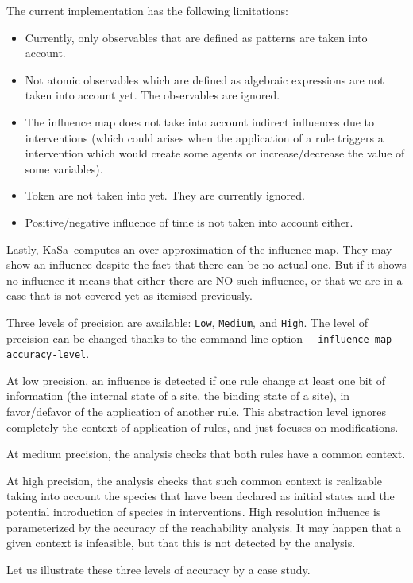 \documentclass[11pt]{book}
\begin{document}
The current implementation has the following limitations:
\begin{itemize}
\item Currently, only observables that are defined as patterns are taken into account.
\item Not atomic observables which are defined as algebraic expressions are not taken into account yet. The observables are ignored.
\item The influence map does not take into account indirect influences due to interventions (which could arises when the application of a rule triggers a intervention which would create some agents or increase/decrease the value of some variables).
\item Token are not taken into yet. They are currently ignored.
\item Positive/negative influence of time is not taken into account either.
\end{itemize}

Lastly, KaSa\ computes an over-approximation of the influence map. They may show an influence despite the fact that there can be no actual one. But if it shows no influence it means that either there are NO such influence, or that we are in a case that is not covered yet as itemised previously.

Three levels of precision are available: \texttt{Low}, \texttt{Medium}, and
\texttt{High}. The level of precision can be changed thanks to the command line option \texttt{-{}-influence-map-accuracy-level}.

At low precision, an influence is detected if one rule change at least one bit of information (the internal state of a site, the binding state of a site), in favor/defavor of the application of another rule. This abstraction level ignores completely the context of application of rules, and just focuses on modifications.

At medium precision, the analysis checks that both rules have a common context.

At high precision, the analysis checks that such common context is realizable taking into account the species that have been declared as initial states
and the potential introduction of species in interventions. High resolution influence is parameterized by the accuracy of the reachability analysis.
It may happen that a given context is infeasible, but that this is not detected by the analysis.

Let us illustrate these three levels of accuracy by a case study.
\end{document}
